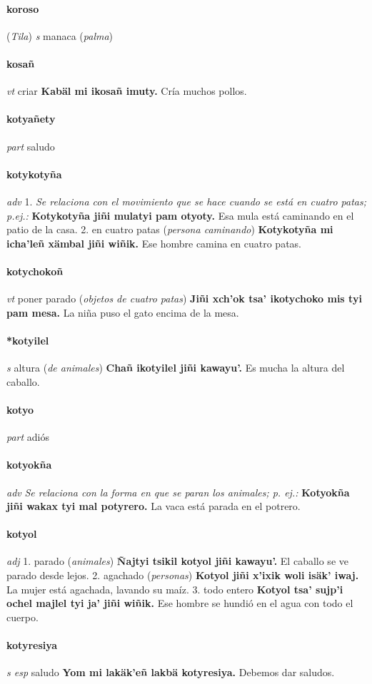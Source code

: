 \documentclass{scrbook}
\newcommand{\entry}[1]{\paragraph{#1}}
\newcommand{\onedefinition}[1]{#1.}
\newcommand{\nontranslationdef}[1]{\textit{#1}}
\newcommand{\partofspeech}[1]{\textit{#1}}
\newcommand{\spanishtranslation}[1]{#1}
\newcommand{\clarification}[1]{(\textit{#1})}
\newcommand{\cholexample}[1]{\textbf{#1}}
\newcommand{\exampletranslation}[1]{#1}
\newcommand{\relevantdialect}[1]{(\textit{#1})}
\begin{document}
\begin{multicols}{2}
\entry{koroso}
\relevantdialect{Tila}
\partofspeech{s}
\spanishtranslation{manaca}
\clarification{palma}

\entry{kosañ}
\partofspeech{vt}
\spanishtranslation{criar}
\cholexample{Kabäl mi ikosañ imuty.}
\exampletranslation{Cría muchos pollos.}

\entry{kotyañety}
\partofspeech{part}
\spanishtranslation{saludo}

\entry{kotykotyña}
\partofspeech{adv}
\onedefinition{1}
\nontranslationdef{Se relaciona con el movimiento que se hace cuando se está en cuatro patas; p.ej.:}
\cholexample{Kotykotyña jiñi mulatyi pam otyoty.}
\exampletranslation{Esa mula está caminando en el patio de la casa.}
\onedefinition{2}
\spanishtranslation{en cuatro patas}
\clarification{persona caminando}
\cholexample{Kotykotyña mi icha'leñ xämbal jiñi wiñik.}
\exampletranslation{Ese hombre camina en cuatro patas.}

\entry{kotychokoñ}
\partofspeech{vt}
\spanishtranslation{poner parado}
\clarification{objetos de cuatro patas}
\cholexample{Jiñi xch'ok tsa' ikotychoko mis tyi pam mesa.}
\exampletranslation{La niña puso el gato encima de la mesa.}

\entry{*kotyilel}
\partofspeech{s}
\spanishtranslation{altura}
\clarification{de animales}
\cholexample{Chañ ikotyilel jiñi kawayu'.}
\exampletranslation{Es mucha la altura del caballo.}

\entry{kotyo}
\partofspeech{part}
\spanishtranslation{adiós}

\entry{kotyokña}
\partofspeech{adv}
\nontranslationdef{Se relaciona con la forma en que se paran los animales; p. ej.:}
\cholexample{Kotyokña jiñi wakax tyi mal potyrero.}
\exampletranslation{La vaca está parada en el potrero.}

\entry{kotyol}
\partofspeech{adj}
\onedefinition{1}
\spanishtranslation{parado}
\clarification{animales}
\cholexample{Ñajtyi tsikil kotyol jiñi kawayu'.}
\exampletranslation{El caballo se ve parado desde lejos.}
\onedefinition{2}
\spanishtranslation{agachado}
\clarification{personas}
\cholexample{Kotyol jiñi x'ixik woli isäk' iwaj.}
\exampletranslation{La mujer está agachada, lavando su maíz.}
\onedefinition{3}
\spanishtranslation{todo entero}
\cholexample{Kotyol tsa' sujp'i ochel majlel tyi ja' jiñi wiñik.}
\exampletranslation{Ese hombre se hundió en el agua con todo el cuerpo.}

\entry{kotyresiya}
\partofspeech{s esp}
\spanishtranslation{saludo}
\cholexample{Yom mi lakäk'eñ lakbä kotyresiya.}
\exampletranslation{Debemos dar saludos.}


\end{multicols}
\end{document}

